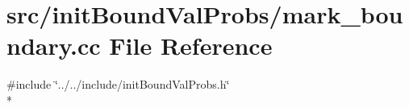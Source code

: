 \section{src/init\-Bound\-Val\-Probs/mark\-\_\-boundary.cc File Reference}
\label{mark__boundary_8cc}
{\ttfamily \#include \char`\"{}../../include/init\-Bound\-Val\-Probs.\-h\char`\"{}}\\*

